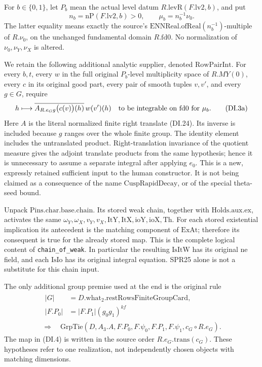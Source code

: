 For \(b\in\{0,1\}\), let \(P_b\) mean the actual level datum
\(R.\mathrm{levR}(F.\mathrm{lv2},b)\), and put
\[
 n_b=\mathrm{nP}(F.\mathrm{lv2},b)>0,\qquad
 \mu_b=n_b^{-1}\nu_0.
 \tag{DI.3}
\]
The latter equality means exactly the source's
\(\mathrm{ENNReal.ofReal}(n_b^{-1})\)-multiple of \(R.\nu_0\),
on the unchanged fundamental domain \(R.\mathrm{fd0}\).
No normalization of \(\nu_0,\nu_Y,\nu_X\) is altered.

We retain the following additional analytic supplier, denoted
\(\mathrm{RowPairInt}\). For every \(b,t\), every \(w\) in
the full original \(P_b\)-level multiplicity space of \(R.MY(0)\),
every \(c\) in its original good part, every pair of smooth tuples
\(v,v'\), and every \(g\in G\), require
\[
 h\longmapsto
 \overline{A_{R.e_Gg}\bigl(c(v)\bigr)(h)}\,w(v')(h)
 \quad\hbox{to be integrable on }\mathrm{fd0}
                         \hbox{ for }\mu_b.
 \tag{DI.3a}
\]
Here \(A\) is the literal normalized finite right translate
(DI.24). Its inverse is included because \(g\) ranges over the
whole finite group. The identity element includes the untranslated
product. Right-translation invariance of the quotient measure gives
the adjoint translate products from the same hypothesis; hence it is
unnecessary to assume a separate integral after applying \(e_0\).
This is a new, expressly retained sufficient input to the human
constructor. It is not being claimed as a consequence of the name
\(\mathrm{CuspRapidDecay}\), or of the special theta-seed bound.

Unpack \(\mathrm{Pins}.\mathrm{char}.\mathrm{base}.\mathrm{chain}\).
Its stored weak chain, together with
\(\mathrm{Holds}.\mathrm{aux}.\mathrm{ex}\), activates the same
\(\omega_Y,\omega_X,v_Y,v_X,\mathrm{ItY},\mathrm{ItX},
\mathrm{ioY},\mathrm{ioX},\mathrm{Th}\).
For each stored existential implication its antecedent is the matching
component of \(\mathrm{ExAt}\); therefore its consequent is true for
the already stored map. This is the complete logical content of
\texttt{chain\_of\_weak}. In particular the resulting
\(\mathrm{IsItW}\) has its original \(\mathrm{ne}\) field, and each
\(\mathrm{IsIo}\) has its original integral equation. SPR25 alone is
not a substitute for this chain input.

The only additional group premise used at the end is the original rule
\[
 \begin{gathered}
 \begin{aligned}
 |G|&=D.\mathrm{what}_2.\mathrm{restRowsFiniteGroupCard},\\
 |F.P_0|&=|F.P_1|(g_0g_1)^{kf}
 \end{aligned}\\
 \Longrightarrow\quad
 \mathrm{GrpTie}(D,A_3.A,F.P_0,F.\psi_0,F.P_1,F.\psi_1,
                       c_G\circ R.e_G).
 \end{gathered}
 \tag{DI.4}
\]
The map in (DI.4) is written in the source order
\(R.e_G.\mathrm{trans}(c_G)\). These hypotheses refer to one
realization, not independently chosen objects with matching dimensions.

